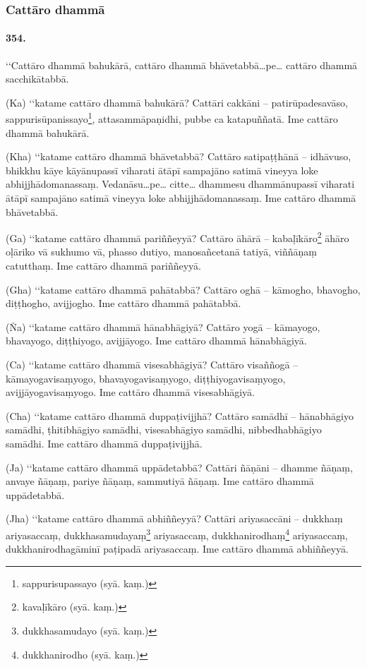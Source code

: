 \subsubsection{Cattāro dhammā}

\paragraph{354.} ‘‘Cattāro dhammā bahukārā, cattāro dhammā bhāvetabbā…pe… cattāro dhammā sacchikātabbā.

(Ka) ‘‘katame cattāro dhammā bahukārā? Cattāri cakkāni – patirūpadesavāso, sappurisūpanissayo\footnote{sappurisupassayo (syā. kaṃ.)}, attasammāpaṇidhi, pubbe ca katapuññatā. Ime cattāro dhammā bahukārā.

(Kha) ‘‘katame cattāro dhammā bhāvetabbā? Cattāro satipaṭṭhānā – idhāvuso, bhikkhu kāye kāyānupassī viharati ātāpī sampajāno satimā vineyya loke abhijjhādomanassaṃ. Vedanāsu…pe… citte… dhammesu dhammānupassī viharati ātāpī sampajāno satimā vineyya loke abhijjhādomanassaṃ. Ime cattāro dhammā bhāvetabbā.

(Ga) ‘‘katame cattāro dhammā pariññeyyā? Cattāro āhārā – kabaḷīkāro\footnote{kavaḷīkāro (syā. kaṃ.)} āhāro oḷāriko vā sukhumo vā, phasso dutiyo, manosañcetanā tatiyā, viññāṇaṃ catutthaṃ. Ime cattāro dhammā pariññeyyā.

(Gha) ‘‘katame cattāro dhammā pahātabbā? Cattāro oghā – kāmogho, bhavogho, diṭṭhogho, avijjogho. Ime cattāro dhammā pahātabbā.

(Ṅa) ‘‘katame cattāro dhammā hānabhāgiyā? Cattāro yogā – kāmayogo, bhavayogo, diṭṭhiyogo, avijjāyogo. Ime cattāro dhammā hānabhāgiyā.

(Ca) ‘‘katame cattāro dhammā visesabhāgiyā? Cattāro visaññogā – kāmayogavisaṃyogo, bhavayogavisaṃyogo, diṭṭhiyogavisaṃyogo, avijjāyogavisaṃyogo. Ime cattāro dhammā visesabhāgiyā.

(Cha) ‘‘katame cattāro dhammā duppaṭivijjhā? Cattāro samādhī – hānabhāgiyo samādhi, ṭhitibhāgiyo samādhi, visesabhāgiyo samādhi, nibbedhabhāgiyo samādhi. Ime cattāro dhammā duppaṭivijjhā.

(Ja) ‘‘katame cattāro dhammā uppādetabbā? Cattāri ñāṇāni – dhamme ñāṇaṃ, anvaye ñāṇaṃ, pariye ñāṇaṃ, sammutiyā ñāṇaṃ. Ime cattāro dhammā uppādetabbā.

(Jha) ‘‘katame cattāro dhammā abhiññeyyā? Cattāri ariyasaccāni – dukkhaṃ ariyasaccaṃ, dukkhasamudayaṃ\footnote{dukkhasamudayo (syā. kaṃ.)} ariyasaccaṃ, dukkhanirodhaṃ\footnote{dukkhanirodho (syā. kaṃ.)} ariyasaccaṃ, dukkhanirodhagāminī paṭipadā ariyasaccaṃ. Ime cattāro dhammā abhiññeyyā.

